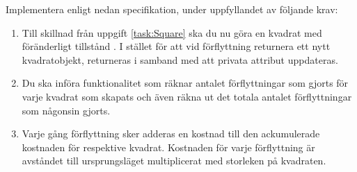 \Subtask Implementera  enligt nedan specifikation, under uppfyllandet av följande krav:

\begin{enumerate}
\item Till skillnad från uppgift \ref{task:Square} ska du nu göra en kvadrat med föränderligt tillstånd . I stället för att vid förflyttning returnera ett nytt kvadratobjekt, returneras  i samband med att privata attribut uppdateras.
\item Du ska införa funktionalitet som räknar antalet förflyttningar som gjorts för varje kvadrat som skapats och även räkna ut det totala antalet förflyttningar som någonsin gjorts.
\item Varje gång förflyttning sker adderas en kostnad till den ackumulerade kostnaden för respektive kvadrat. Kostnaden för varje förflyttning är avståndet till ursprungsläget multiplicerat med storleken på kvadraten.
\end{enumerate}

